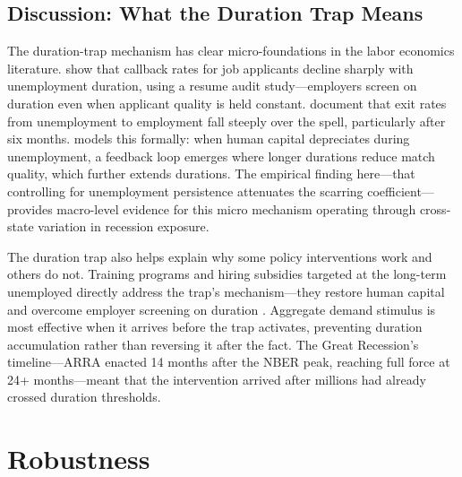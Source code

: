 \documentclass[12pt]{article}
\begin{document}
\subsection{Discussion: What the Duration Trap Means}

The duration-trap mechanism has clear micro-foundations in the labor economics literature. \citet{kroft2016long} show that callback rates for job applicants decline sharply with unemployment duration, using a resume audit study---employers screen on duration even when applicant quality is held constant. \citet{elsby2010labor} document that exit rates from unemployment to employment fall steeply over the spell, particularly after six months. \citet{pissarides1992loss} models this formally: when human capital depreciates during unemployment, a feedback loop emerges where longer durations reduce match quality, which further extends durations. The empirical finding here---that controlling for unemployment persistence attenuates the scarring coefficient---provides macro-level evidence for this micro mechanism operating through cross-state variation in recession exposure.

The duration trap also helps explain why some policy interventions work and others do not. Training programs and hiring subsidies targeted at the long-term unemployed directly address the trap's mechanism---they restore human capital and overcome employer screening on duration \citep{card2018works}. Aggregate demand stimulus is most effective when it arrives before the trap activates, preventing duration accumulation rather than reversing it after the fact. The Great Recession's timeline---ARRA enacted 14 months after the NBER peak, reaching full force at 24+ months---meant that the intervention arrived after millions had already crossed duration thresholds.


\section{Robustness}
\label{sec:robustness}


\end{document}
